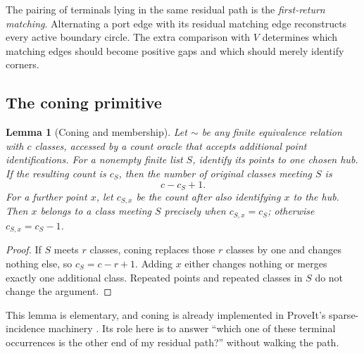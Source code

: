 \documentclass[11pt]{article}
\newtheorem{lemma}[theorem]{Lemma}
\theoremstyle{definition}
\theoremstyle{remark}\newtheorem{remark}[theorem]{Remark}
\begin{document}
The pairing of terminals lying in the same residual path is the \emph{first-return matching}. Alternating a port edge with its residual matching edge reconstructs every active boundary circle. The extra comparison with $V$ determines which matching edges should become positive gaps and which should merely identify corners.

\subsection{The coning primitive}
\begin{lemma}[Coning and membership]\label{lem:coning}
Let $\sim$ be any finite equivalence relation with $c$ classes, accessed by a count oracle that accepts additional point identifications. For a nonempty finite list $S$, identify its points to one chosen hub. If the resulting count is $c_S$, then the number of original classes meeting $S$ is
\[
                    c-c_S+1.
\]
For a further point $x$, let $c_{S,x}$ be the count after also identifying $x$ to the hub. Then $x$ belongs to a class meeting $S$ precisely when $c_{S,x}=c_S$; otherwise $c_{S,x}=c_S-1$.
\end{lemma}
\begin{proof}
If $S$ meets $r$ classes, coning replaces those $r$ classes by one and changes nothing else, so $c_S=c-r+1$. Adding $x$ either changes nothing or merges exactly one additional class. Repeated points and repeated classes in $S$ do not change the argument.
\end{proof}

This lemma is elementary, and coning is already implemented in ProveIt's sparse-incidence machinery \cite{sparse}. Its role here is to answer ``which one of these terminal occurrences is the other end of my residual path?'' without walking the path.
\end{document}
